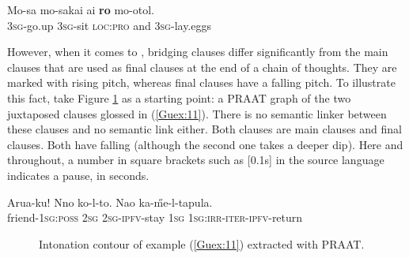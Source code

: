 \documentclass[output=paper]{LSP/langsci}
\begin{document}
\begin{exe}
\ex \label{Guex:10}
\gll Mo-sa    mo-sakai  ai \textbf{ro}  mo-otol.\\     	       
\textsc{3sg}-go.up \textsc{3sg}-sit \textsc{loc:pro}  and   \textsc{3sg}-lay.eggs\\
\glt {} \citep[][320]{guerin11}
\end{exe}

However, when it comes to , bridging clauses differ significantly from the main clauses that are used as final clauses at the end of a chain of thoughts. They are marked with rising pitch, whereas final clauses have a falling pitch. To illustrate this fact, take Figure \ref{GuF1} as a starting point: a PRAAT graph of the two juxtaposed clauses glossed in (\ref{Guex:11}). There is no semantic linker between these clauses and no semantic link either. Both clauses are main clauses and final clauses. Both have falling  (although the second one takes a deeper dip). Here and throughout, a number in square brackets such as [0.1s] in the source language indicates a pause, in seconds.\nocite{PRAAT}

\begin{exe}
\ex \label{Guex:11}
\gll Arua-ku!      Nno  ko-l-to.            Nao   ka-\H{m}e-l-tapula.\\     	       
friend-\textsc{1sg:poss}   \textsc{2sg}  \textsc{2sg-ipfv-}stay \textsc{1sg}   \textsc{1sg:irr-iter-ipfv}-return \\
\glt {} 
\end{exe}

\begin{figure}[ht]
\caption{Intonation contour of example (\ref{Guex:11}) extracted with PRAAT. \label{GuF1}}
\end{figure}
\end{document}
